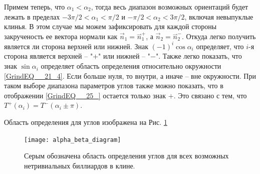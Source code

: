 \documentclass[a4paper]{article}
\begin{document}
 Примем теперь, что $\alpha_1<\alpha_2$, тогда весь диапазон возможных ориентаций будет лежать в пределах $-3\pi/2<\alpha_1<\pi/2$ и $-\pi/2<\alpha_2<3\pi/2$, включая невыпуклые клинья. В этом случае мы можем зафиксировать для каждой стороны закрученость ее вектора нормали как $\vec{n}_1=\overset{\rightharpoonup }{n}_1^+$, а $\vec{n}_2=\overset{\rightharpoonup }{n}_2^-$. Откуда легко получить является ли сторона верхней или нижней. Знак $(-1)^i\cos\alpha_i$ определяет, что $i$-я сторона является верхней -- "$+$" или нижней -- "$-$". Также легко показать, что знак $\sin\alpha_i$ определяет область определения относительно окружности \eqref{GrindEQ__21_4}. Если больше нуля, то внутри, а иначе -- вне окружности.  При таком выборе диапазона параметров углов также можно показать, что в отображении \eqref{GrindEQ__25_} остается только знак $+$. Это связано с тем, что $T^+(\alpha_i)=T^-(\alpha_i\pm\pi)$.

Область определения для углов изображена на Рис. \ref{fig:alpha_beta_diagram}

\begin{figure}[ht]
  \centering
  \texttt{[image: alpha\_beta\_diagram]}\\
  \caption{Серым обозначена область определения углов для всех возможных нетривиальных биллиардов в клине.}\label{fig:alpha_beta_diagram}
\end{figure}
 
 

\end{document}
